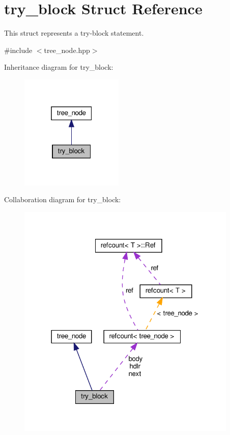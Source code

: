 \hypertarget{structtry__block}{}\section{try\+\_\+block Struct Reference}
\label{structtry__block}


This struct represents a try-\/block statement.  




{\ttfamily \#include $<$tree\+\_\+node.\+hpp$>$}



Inheritance diagram for try\+\_\+block\+:
\nopagebreak
\begin{figure}[H]
\begin{center}
\leavevmode
\includegraphics[width=139pt]{de/d81/structtry__block__inherit__graph}
\end{center}
\end{figure}


Collaboration diagram for try\+\_\+block\+:
\nopagebreak
\begin{figure}[H]
\begin{center}
\leavevmode
\includegraphics[width=297pt]{de/df1/structtry__block__coll__graph}
\end{center}
\end{figure}
